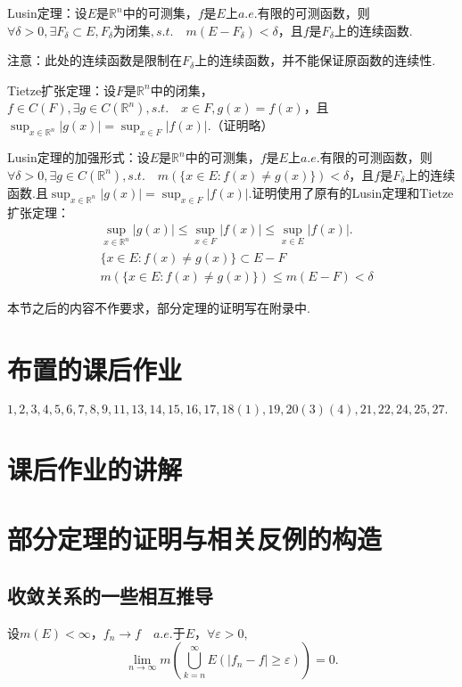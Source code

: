 \documentclass[bwprint, withoutpreface]{cumcmthesis}
\begin{document}
Lusin定理：设$E$是$\mathbb{R}^n$中的可测集，$f$是$E$上$a.e.$有限的可测函数，则$\forall \delta > 0, \exists F_{\delta} \subset E, F_{\delta}\mbox{为闭集}, s.t. \quad m(E - F_{\delta}) < \delta$，且$f$是$F_{\delta}$上的连续函数.

注意：此处的连续函数是限制在$F_{\delta}$上的连续函数，并不能保证原函数的连续性.

Tietze扩张定理：设$F$是$\mathbb{R}^n$中的闭集，$f \in C(F), \exists g \in C(\mathbb{R}^n), s.t. \quad x \in F, g(x) = f(x)$，且$\sup_{x \in \mathbb{R}^n}{|g(x)|} = \sup_{x \in F}{|f(x)|}$.（证明略）

Lusin定理的加强形式：设$E$是$\mathbb{R}^n$中的可测集，$f$是$E$上$a.e.$有限的可测函数，则$\forall \delta > 0, \exists g \in C(\mathbb{R}^n), s.t. \quad m(\{x \in E:f(x) \neq g(x)\}) < \delta$，且$f$是$F_{\delta}$上的连续函数.且$\sup_{x \in \mathbb{R}^n}{|g(x)|} = \sup_{x \in F}{|f(x)|}$.证明使用了原有的Lusin定理和Tietze扩张定理：
\begin{align*}
	& \sup_{x \in \mathbb{R}^n}{|g(x)|} \leqslant \sup_{x \in F}{|f(x)|} \leqslant \sup_{x \in E}{|f(x)|}. \\
	& \{x \in E:f(x) \neq g(x)\} \subset E - F \\
	& m(\{x \in E:f(x) \neq g(x)\}) \leqslant m(E - F) < \delta
\end{align*}

本节之后的内容不作要求，部分定理的证明写在附录中.

\appendix
\section{布置的课后作业}
\indent $1,2,3,4,5,6,7,8,9,11,13,14,15,16,17,18(1),19,20(3)(4),21,22,24,25,27.$

\section{课后作业的讲解}

\section{部分定理的证明与相关反例的构造}
\subsection{收敛关系的一些相互推导}
\begin{theorem}
	设$m(E) < \infty$，$f_n \to f \quad a.e.\mbox{于}E$，$\forall \varepsilon > 0,$
	\begin{equation*}
		\lim_{n \to \infty} m(\bigcup_{k = n}^{\infty}{E(|f_n - f| \geqslant \varepsilon)}) = 0.
	\end{equation*} 
\end{theorem}
\end{document}

